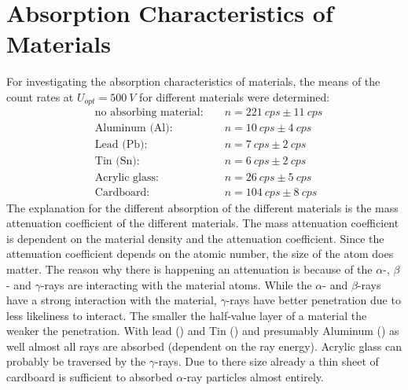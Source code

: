 \section{Absorption Characteristics of Materials}
%
For investigating the absorption characteristics of materials, the means of the count rates at
\(U_{opt}=\SI{500}{V}\) for different materials were determined:
%
\begin{align}
&\text{no absorbing material: }  &&n = \SI{221}{cps} \pm \SI{11}{cps}\\
&\text{Aluminum (Al): }          &&n = \SI{10}{cps} \pm \SI{4}{cps}\\
&\text{Lead (Pb): }              &&n = \SI{7}{cps} \pm \SI{2}{cps}\\
&\text{Tin (Sn): }               &&n = \SI{6}{cps} \pm \SI{2}{cps}\\
&\text{Acrylic glass: }          &&n = \SI{26}{cps} \pm \SI{5}{cps}\\
&\text{Cardboard: }              &&n = \SI{104}{cps} \pm \SI{8}{cps}
\end{align}
%
The explanation for the different absorption of the different materials is the mass attenuation coefficient of the
different materials. The mass attenuation coefficient is dependent on the material density and the attenuation
coefficient. Since the attenuation coefficient depends on the atomic number, the size of the atom does
matter. The reason why there is happening an attenuation is because of the \(\alpha\)-, \(\beta\)- and \(\gamma\)-rays are
interacting with the material atoms. While the \(\alpha\)- and \(\beta\)-rays have a strong interaction with the material,
\(\gamma\)-rays have better penetration due to less likeliness to interact. The smaller the half-value layer of a
material the weaker the penetration. With lead () and Tin () and presumably Aluminum
() as well almost all rays are absorbed (dependent on the ray energy). Acrylic glass can probably be
traversed by the \(\gamma\)-rays. Due to there size already a thin sheet of cardboard is sufficient to absorbed
\(\alpha\)-ray particles almost entirely.
%
